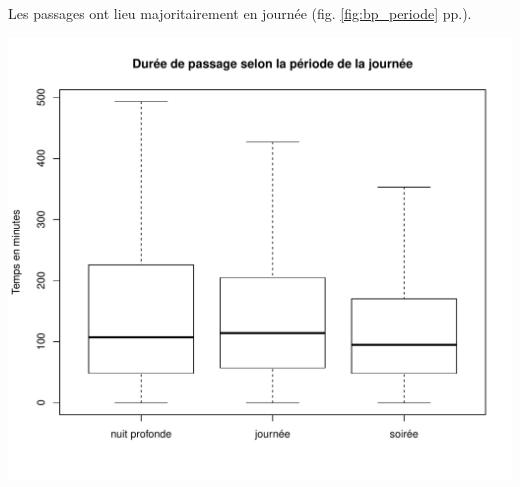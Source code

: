 \documentclass[12pt,english,french,twoside]{book}\usepackage[]{graphicx}\usepackage[]{color}
\makeatletter
\def\maxwidth{ %
  \ifdim\Gin@nat@width>\linewidth
    \linewidth
  \else
    \Gin@nat@width
  \fi
}
\newenvironment{knitrout}{}{} %
\makeatother
\begin{document}
Les passages ont lieu majoritairement en journée (fig. \ref{fig:bp_periode} pp.\pageref{fig:bp_periode}).


\begin{center}
\begin{knitrout}
\color{fgcolor}
\includegraphics[width=\maxwidth]{figure/periode_2} 

\end{knitrout}

 \label{fig:bp_periode2}
\end{center}
\end{document}
